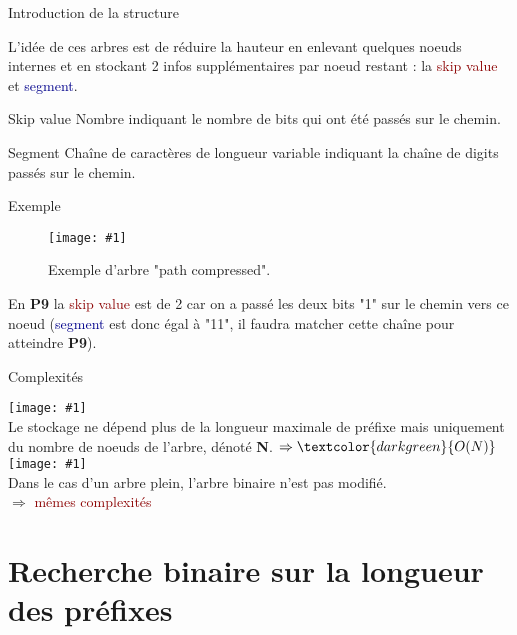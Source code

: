 \documentclass{beamer}
\newcommand{\imageR}[2]{\texttt{[image: \#1]}}
\newcommand{\gre}[1]{\textcolor{darkgreen}{#1}}
\newcommand{\blu}[1]{\textcolor{darkblue}{#1}}
\newcommand{\red}[1]{\textcolor{darkred}{#1}}
\begin{document}
\begin{frame}{Introduction de la structure}

L'idée de ces arbres est de réduire la hauteur en enlevant quelques noeuds internes et en stockant 2 infos supplémentaires par 
noeud restant : la \red{skip value} et \blu{segment}.

\begin{block}{Skip value}
Nombre indiquant le nombre de bits qui ont été passés sur le chemin.
\end{block}

\begin{block}{Segment}
Chaîne de caractères de longueur variable indiquant la chaîne de digits passés sur le chemin.
\end{block}

\end{frame}

\begin{frame}{Exemple}

\begin{figure}
	\begin{center}
	\imageR{CN_006.png}{225}
	\caption{Exemple d'arbre "path compressed".}
	\end{center}	
\end{figure}

En \textbf{P9} la \red{skip value} est de 2 car on a passé les deux bits "1" sur le chemin vers ce noeud (\blu{segment} est donc 
égal à "11", il faudra matcher cette chaîne pour atteindre \textbf{P9}).

\end{frame}

\begin{frame}{Complexités}

\imageR{good.png}{15} \\
Le stockage ne dépend plus de la longueur maximale de préfixe mais uniquement du nombre de noeuds de l'arbre, dénoté \textbf{N}.
$\Rightarrow \gre{O(N)}$\\$ $\\
\imageR{bad.png}{15}\\
Dans le cas d'un arbre plein, l'arbre binaire n'est pas modifié.\\ $\Rightarrow$ \red{mêmes complexités}
\end{frame}


\section{Recherche binaire sur la longueur des préfixes}
\end{document}
